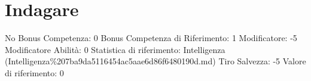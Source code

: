 \section{Indagare}\label{indagare}

\begin{description}
\tightlist
\item[Tags: ABI]
No Bonus Competenza: 0 Bonus Competenza di Riferimento: 1 Modificatore:
-5 Modificatore Abilità: 0 Statistica di riferimento: Intelligenza
(Intelligenza\%207ba9da5116454ac5aae6d86f6480190d.md) Tiro Salvezza: -5
Valore di riferimento: 0
\end{description}
